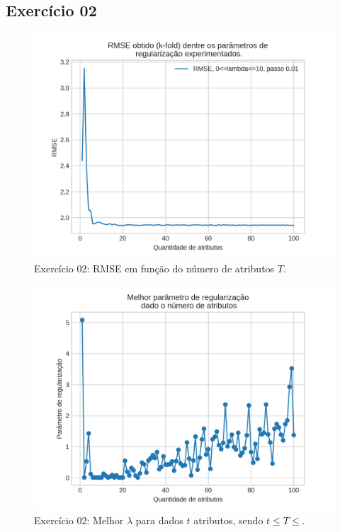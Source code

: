 \documentclass{article}
\begin{document}
    \newpage
    \subsection[]{Exercício 02}
    \begin{figure}[!h]
        \centering
        \includegraphics[width=\linewidth]{ex02/TsMeans.png}
        \caption{Exercício 02: RMSE em função do número de atributos $T$.}
        \label{fig:ex2_TRMSE}
    \end{figure}
    \begin{figure}[!h]
        \centering
        \includegraphics[width=\linewidth]{ex02/Tslambs.png}
        \caption{Exercício 02: Melhor $\lambda$ para dados $t$ atributos, sendo $t \leqslant T \leqslant $.}
        \label{fig:ex2_Tlamb}
    \end{figure}
\end{document}
